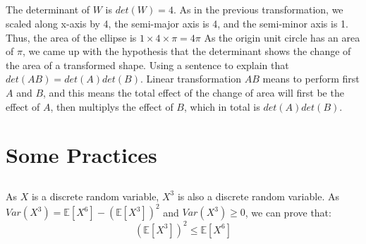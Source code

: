 \documentclass{article}
\begin{document}
\subsection{} %
The determinant of $ W $ is $ det(W ) = 4 $. As in the previous transformation, we scaled along x-axis by 4, the semi-major axis is 4, and the semi-minor axis is 1. Thus, the area of the ellipse is $ 1 \times 4 \times \pi = 4\pi $ As the origin unit circle has an area of $ \pi  $, we came up with the hypothesis that the determinant shows the change of the area of a transformed shape. Using  a sentence to explain that $ det(AB ) = det(A )det(B ) $. Linear transformation $ AB $ means to perform first $ A $ and $ B $, and this means the total effect of the change of area will first be the effect of $ A  $, then multiplys the effect of $ B $, which in total is $ det(A )det(B) $.
\section{Some Practices}\label{sec:Some Practices} %
\subsection{}\label{} %
As $ X $ is a discrete random variable, $ X^3 $ is also a discrete random variable. As $ Var(X^3) = \mathbb{E}[X^6] - (\mathbb{E}[X^3])^2 $ and $ Var(X^3) \geq 0 $, we can prove that:
\[
(\mathbb{E}[X^3])^2 \leq \mathbb{E}[X^6]
\]
\end{document}
